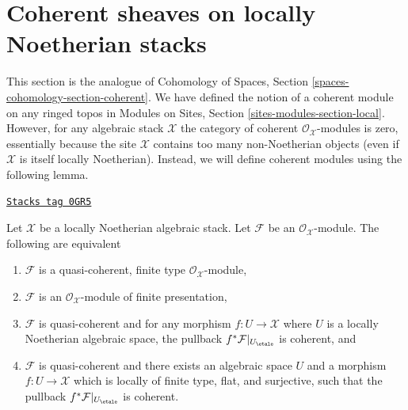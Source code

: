 \section{Coherent sheaves on locally Noetherian stacks}
\label{stacks-cohomology-section-coherent-sheaves}
This section is the analogue of
Cohomology of Spaces, Section
\ref{spaces-cohomology-section-coherent}.
We have defined the notion of a coherent module on any ringed topos in
Modules on Sites, Section \ref{sites-modules-section-local}.
However, for any algebraic stack $\mathcal{X}$ the category of
coherent $\mathcal{O}_\mathcal{X}$-modules is zero, essentially because
the site $\mathcal{X}$ contains too many non-Noetherian objects (even
if $\mathcal{X}$ is itself locally Noetherian). Instead, we will define
coherent modules using the following lemma.

\begin{lemma}
\label{stacks-cohomology-lemma-coherent-Noetherian}
\href{https://stacks.math.columbia.edu/tag/0GR5}{\texttt{Stacks tag 0GR5}}

Let $\mathcal{X}$ be a locally Noetherian algebraic stack.
Let $\mathcal{F}$ be an $\mathcal{O}_\mathcal{X}$-module.
The following are equivalent
\begin{enumerate}
\item $\mathcal{F}$ is a quasi-coherent, finite type
$\mathcal{O}_\mathcal{X}$-module,
\item $\mathcal{F}$ is an $\mathcal{O}_\mathcal{X}$-module
of finite presentation,
\item $\mathcal{F}$ is quasi-coherent and for any morphism
$f : U \to \mathcal{X}$ where $U$ is a locally Noetherian algebraic space,
the pullback $f^*\mathcal{F}|_{U_\etale}$ is coherent, and
\item $\mathcal{F}$ is quasi-coherent and there exists an algebraic space
$U$ and a morphism $f : U \to \mathcal{X}$ which is locally of finite type,
flat, and surjective, such that the pullback $f^*\mathcal{F}|_{U_\etale}$
is coherent.
\end{enumerate}
\end{lemma}

